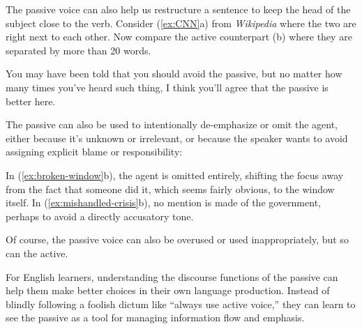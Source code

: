 The passive voice can also help us restructure a sentence to keep the head of the subject close to the verb. Consider (\ref{ex:CNN}a) from \textit{Wikipedia} where the two are right next to each other. Now compare the active counterpart (b) where they are separated by more than 20 words.

\ea\label{ex:CNN}
    \z
\z

You may have been told that you should avoid the passive, but no matter how many times you've heard such thing, I think you'll agree that the passive is better here.

The passive can also be used to intentionally de-emphasize or omit the agent, either because it's unknown or irrelevant, or because the speaker wants to avoid assigning explicit blame or responsibility:

\ea\label{ex:broken-window}
    \z
\ex\label{ex:mishandled-crisis}
    \z
\z

In (\ref{ex:broken-window}b), the agent is omitted entirely, shifting the focus away from the fact that someone did it, which seems fairly obvious, to the window itself. In (\ref{ex:mishandled-crisis}b), no mention is made of the government, perhaps to avoid a directly accusatory tone.

Of course, the passive voice can also be overused or used inappropriately, but so can the active.

For English learners, understanding the discourse functions of the passive can help them make better choices in their own language production. Instead of blindly following a foolish dictum like ``always use active voice,'' they can learn to see the passive as a tool for managing information flow and emphasis.

